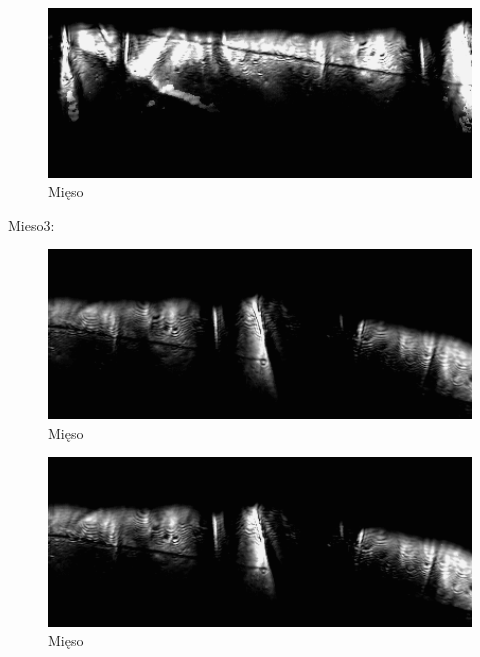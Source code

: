 \documentclass[a4paper,12pt]{article}
\begin{document}
\begin{figure} [H]
  \begin{center}
    \includegraphics[width = 15cm]{data/2MIES3.png}
    \caption{Mięso}
  \end{center}
\end{figure}


Mieso3:

\begin{figure} [H]
  \begin{center}
    \includegraphics[width = 15cm]{data/4MIES1.png}
    \caption{Mięso}
  \end{center}
\end{figure}


\begin{figure} [H]
  \begin{center}
    \includegraphics[width = 15cm]{data/4MIES2.png}
    \caption{Mięso}
  \end{center}
\end{figure}
\end{document}

